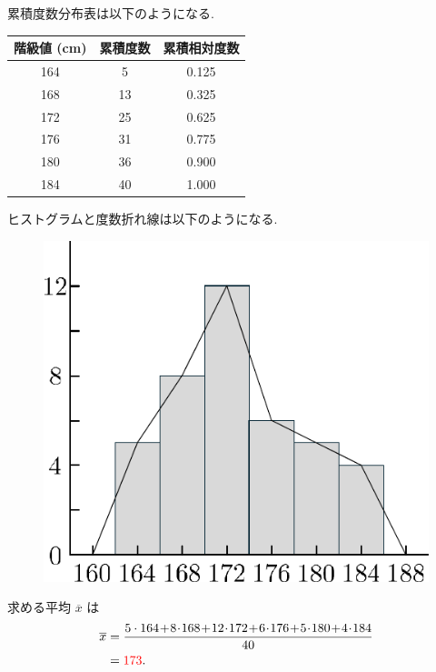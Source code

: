 \begin{qenumerate}
	\item{
		累積度数分布表は以下のようになる.
		\begin{table}[H]
			\centering
			\begin{tabular}{c|c|c} \hline
				階級値 (cm) & 累積度数 & 累積相対度数 \\ \hline
				164 &  5 & 0.125 \\
				168 & 13 & 0.325 \\
				172 & 25 & 0.625 \\
				176 & 31 & 0.775 \\
				180 & 36 & 0.900 \\
				184 & 40 & 1.000 \\ \hline
			\end{tabular}
		\end{table}
	}
	\item{
		ヒストグラムと度数折れ線は以下のようになる.
		\begin{figure}[H]
			\centering
			\includegraphics[scale = 0.5]{./figure/73.pdf}
		\end{figure}
	}
	\item{
		求める平均 $\overline{x}$ は
		\begin{align}
			\overline{x} &= \frac{5\cdot 164 \! + \! 8 \! \cdot \! 168 \! + \! 12 \! \cdot \! 172 \! + \! 6 \! \cdot \! 176 \! + \! 5 \! \cdot \! 180 \! + \! 4 \! \cdot \! 184}{40} \\
				&= \red{173}.

\end{align}}
\end{qenumerate}
